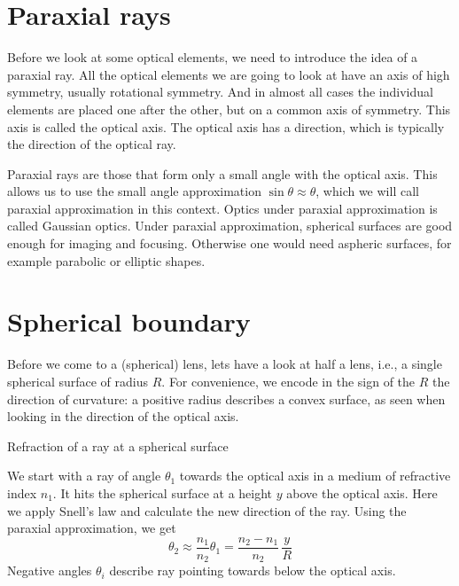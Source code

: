 \section{Paraxial rays}

Before we look at some optical elements, we need to introduce the idea of a paraxial ray. All the optical elements we are going to look at have an axis of high symmetry, usually rotational symmetry. And in almost all cases the individual elements are placed one after the other, but on a common axis of symmetry. This axis is called the optical axis. The optical axis has a direction, which is typically the direction of the optical ray.

Paraxial rays are those that form only a small angle with the optical axis. This allows us to use the small angle approximation $\sin \theta \approx \theta$, which we will call paraxial approximation in this context. Optics under paraxial approximation is called Gaussian optics. Under paraxial approximation, spherical surfaces are good enough for imaging and focusing. Otherwise one would need aspheric surfaces, for example parabolic or elliptic shapes.


\section{Spherical boundary}

Before we come to a (spherical) lens, lets have a look at half a lens, i.e., a single spherical surface of radius $R$. For convenience, we encode in the sign of the $R$ the direction of curvature: a positive radius describes a convex surface, as seen when looking in the direction of the optical axis.

\begin{marginfigure}
   \caption{Refraction of  a ray at a spherical surface}
\end{marginfigure}

We start with a ray of angle $\theta_1$ towards the optical axis in a medium of refractive index $n_1$. It hits the spherical surface at a height $y$ above the optical axis. Here we apply Snell's law and calculate the new direction of the ray. Using the paraxial approximation, we get
\begin{equation}
    \theta_2 \approx \frac{n_1}{n_2} \theta_1 =  \frac{n_2 - n_1}{n_2} \, \frac{y}{R}
    \label{eq:1_single_spherical_surface}
\end{equation}
Negative angles $\theta_i$ describe ray pointing towards below the optical axis.


